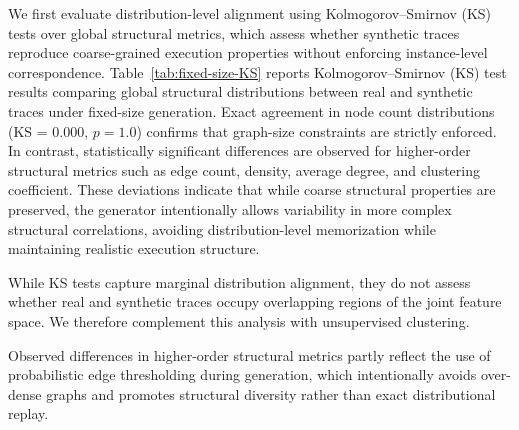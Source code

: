 \documentclass[sigconf,review]{acmart}
\begin{document}
We first evaluate distribution-level alignment using Kolmogorov--Smirnov (KS) tests over global structural metrics, which assess whether synthetic traces reproduce coarse-grained execution properties without enforcing instance-level correspondence. Table~\ref{tab:fixed-size-KS} reports Kolmogorov--Smirnov (KS) test results comparing global structural distributions between real and synthetic traces under fixed-size generation. Exact agreement in node count distributions (KS = 0.000, $p = 1.0$) confirms that graph-size constraints are strictly enforced. In contrast, statistically significant differences are observed for higher-order structural metrics such as edge count, density, average degree, and clustering coefficient. These deviations indicate that while coarse structural properties are preserved, the generator intentionally allows variability in more complex structural correlations, avoiding distribution-level memorization while maintaining realistic execution structure.


\begin{table}
    \centering
    \caption{Dataset-level distribution similarity (KS Test)}
    \label{tab:fixed-size-KS}
\end{table}


While KS tests capture marginal distribution alignment, they do not assess whether real and synthetic traces occupy overlapping regions of the joint feature space. We therefore complement this analysis with unsupervised clustering.

Observed differences in higher-order structural metrics partly reflect the use of probabilistic edge thresholding during generation, which intentionally avoids over-dense graphs and promotes structural diversity rather than exact distributional replay.
\end{document}
